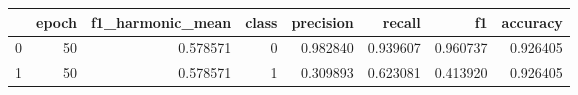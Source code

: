 \begin{tabular}{lrrrrrrr}
\toprule
 & epoch & f1_harmonic_mean & class & precision & recall & f1 & accuracy \\
\midrule
0 & 50 & 0.578571 & 0 & 0.982840 & 0.939607 & 0.960737 & 0.926405 \\
1 & 50 & 0.578571 & 1 & 0.309893 & 0.623081 & 0.413920 & 0.926405 \\
\bottomrule
\end{tabular}
